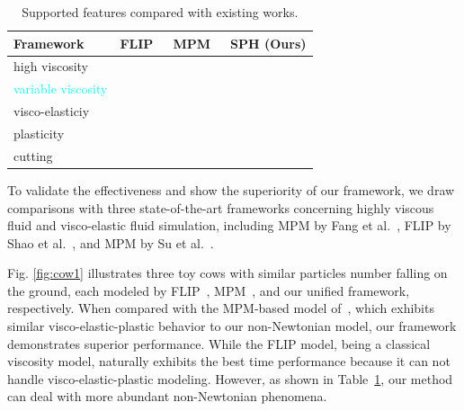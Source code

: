 \documentclass[10pt,journal,compsoc]{IEEEtran}
\newcommand{\revised}[1]{{\textcolor{cyan}{#1}}}
\begin{document}
\begin{table}[htbp]
	\centering
	\caption{Supported features compared with existing works.}\label{tab:feature1}
	\begin{tabular}{llll}
		\toprule
		Framework                    & FLIP~\cite{Shao-Huang2022-unsmoothed} & MPM~\cite{Fang2019-sillyRubber} & SPH (Ours)   \\
		\midrule
		high viscosity               & {\Checkmark}                          & {\Checkmark}                    & {\Checkmark} \\
		\revised{variable viscosity} & {\XSolidBrush}                        & {\XSolidBrush}                  & {\Checkmark} \\
		visco-elasticiy              & {\XSolidBrush}                        & {\Checkmark}                    & {\Checkmark} \\
		plasticity                   & {\XSolidBrush}                        & {\Checkmark}                    & {\Checkmark} \\
		cutting                      & {\XSolidBrush}                        & {\XSolidBrush}                  & {\Checkmark} \\
		\bottomrule
	\end{tabular}
\end{table}

To validate the effectiveness and show the superiority of our framework, we draw comparisons with three state-of-the-art frameworks concerning highly viscous fluid and visco-elastic fluid simulation, including MPM by Fang et al.~\cite{Fang2019-sillyRubber}, FLIP by Shao et al.~\cite{Shao-Huang2022-unsmoothed}, and MPM by Su et al.~\cite{Su2021}.

Fig. \ref{fig:cow1} illustrates three toy cows with similar particles number falling on the ground, each modeled by FLIP~\cite{Shao-Huang2022-unsmoothed}, MPM~\cite{Fang2019-sillyRubber}, and our unified framework, respectively. %
When compared with the MPM-based model of~\cite{Fang2019-sillyRubber}, which exhibits similar  visco-elastic-plastic behavior to our non-Newtonian model, our framework demonstrates superior performance.
While the FLIP model, being a classical viscosity model, naturally exhibits the best time performance because it can not handle visco-elastic-plastic modeling. However, as shown in Table~\ref{tab:feature1}, our method can deal with more abundant non-Newtonian phenomena.
\end{document}
